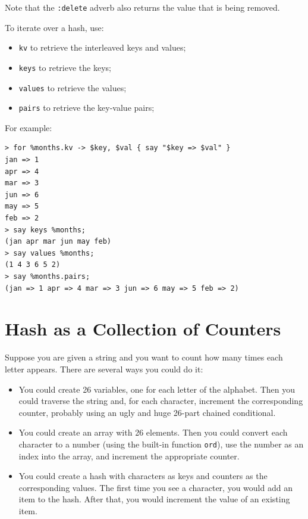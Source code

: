 Note that the {\tt :delete} adverb also returns the value that 
is being removed.

To iterate over a hash, use:

\begin{itemize}
\item {\tt kv} to retrieve the interleaved keys and values;
\item {\tt keys} to retrieve the keys;
\item {\tt values} to retrieve the values;
\item {\tt pairs} to retrieve the key-value pairs;
\end{itemize}

For example:

\begin{verbatim}
> for %months.kv -> $key, $val { say "$key => $val" }
jan => 1
apr => 4
mar => 3
jun => 6
may => 5
feb => 2
> say keys %months;
(jan apr mar jun may feb)
> say values %months;
(1 4 3 6 5 2)
> say %months.pairs;
(jan => 1 apr => 4 mar => 3 jun => 6 may => 5 feb => 2)
\end{verbatim}
%

\section{Hash as a Collection of Counters}
\label{histogram}

Suppose you are given a string and you want to count how many
times each letter appears.  There are several ways you could do it:

\begin{itemize}

\item You could create 26 variables, one for each letter of the
alphabet.  Then you could traverse the string and, for each
character, increment the corresponding counter, probably using
an ugly and huge 26-part chained conditional.

\item You could create an array with 26 elements.  Then you could
convert each character to a number (using the built-in function
{\tt ord}), use the number as an index into the array, and 
increment the appropriate counter.

\item You could create a hash with characters as keys
and counters as the corresponding values.  The first time you
see a character, you would add an item to the hash.  After
that, you would increment the value of an existing item.

\end{itemize}

